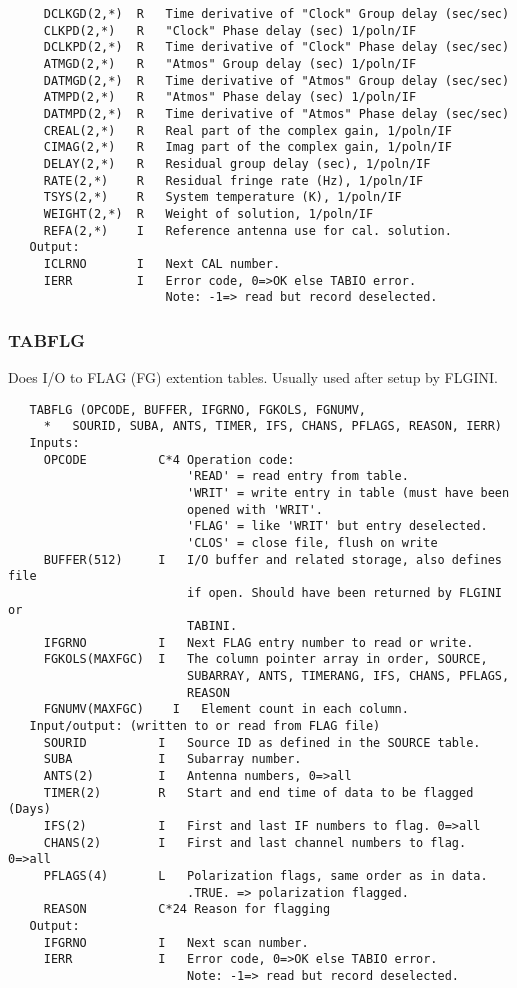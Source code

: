 \begin{verbatim}
     DCLKGD(2,*)  R   Time derivative of "Clock" Group delay (sec/sec)
     CLKPD(2,*)   R   "Clock" Phase delay (sec) 1/poln/IF
     DCLKPD(2,*)  R   Time derivative of "Clock" Phase delay (sec/sec)
     ATMGD(2,*)   R   "Atmos" Group delay (sec) 1/poln/IF
     DATMGD(2,*)  R   Time derivative of "Atmos" Group delay (sec/sec)
     ATMPD(2,*)   R   "Atmos" Phase delay (sec) 1/poln/IF
     DATMPD(2,*)  R   Time derivative of "Atmos" Phase delay (sec/sec)
     CREAL(2,*)   R   Real part of the complex gain, 1/poln/IF
     CIMAG(2,*)   R   Imag part of the complex gain, 1/poln/IF
     DELAY(2,*)   R   Residual group delay (sec), 1/poln/IF
     RATE(2,*)    R   Residual fringe rate (Hz), 1/poln/IF
     TSYS(2,*)    R   System temperature (K), 1/poln/IF
     WEIGHT(2,*)  R   Weight of solution, 1/poln/IF
     REFA(2,*)    I   Reference antenna use for cal. solution.
   Output:
     ICLRNO       I   Next CAL number.
     IERR         I   Error code, 0=>OK else TABIO error.
                      Note: -1=> read but record deselected.
\end{verbatim}

\subsubsection{TABFLG}
Does I/O to FLAG (FG) extention tables. Usually used after setup by
FLGINI.
\begin{verbatim}
   TABFLG (OPCODE, BUFFER, IFGRNO, FGKOLS, FGNUMV,
     *   SOURID, SUBA, ANTS, TIMER, IFS, CHANS, PFLAGS, REASON, IERR)
   Inputs:
     OPCODE          C*4 Operation code:
                         'READ' = read entry from table.
                         'WRIT' = write entry in table (must have been
                         opened with 'WRIT'.
                         'FLAG' = like 'WRIT' but entry deselected.
                         'CLOS' = close file, flush on write
     BUFFER(512)     I   I/O buffer and related storage, also defines file
                         if open. Should have been returned by FLGINI or
                         TABINI.
     IFGRNO          I   Next FLAG entry number to read or write.
     FGKOLS(MAXFGC)  I   The column pointer array in order, SOURCE,
                         SUBARRAY, ANTS, TIMERANG, IFS, CHANS, PFLAGS,
                         REASON
     FGNUMV(MAXFGC)    I   Element count in each column.
   Input/output: (written to or read from FLAG file)
     SOURID          I   Source ID as defined in the SOURCE table.
     SUBA            I   Subarray number.
     ANTS(2)         I   Antenna numbers, 0=>all
     TIMER(2)        R   Start and end time of data to be flagged (Days)
     IFS(2)          I   First and last IF numbers to flag. 0=>all
     CHANS(2)        I   First and last channel numbers to flag. 0=>all
     PFLAGS(4)       L   Polarization flags, same order as in data.
                         .TRUE. => polarization flagged.
     REASON          C*24 Reason for flagging
   Output:
     IFGRNO          I   Next scan number.
     IERR            I   Error code, 0=>OK else TABIO error.
                         Note: -1=> read but record deselected.
\end{verbatim}

